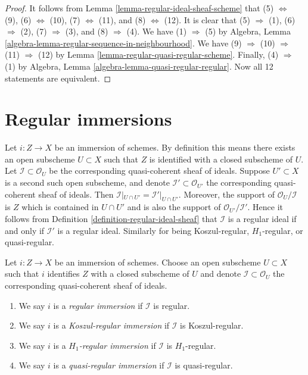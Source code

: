 \begin{proof}
It follows from
Lemma \ref{lemma-regular-ideal-sheaf-scheme}
that (5) $\Leftrightarrow$ (9), (6) $\Leftrightarrow$ (10),
(7) $\Leftrightarrow$ (11), and (8) $\Leftrightarrow$ (12).
It is clear that (5) $\Rightarrow$ (1), (6) $\Rightarrow$ (2),
(7) $\Rightarrow$ (3), and (8) $\Rightarrow$ (4).
We have (1) $\Rightarrow$ (5) by
Algebra, Lemma \ref{algebra-lemma-regular-sequence-in-neighbourhood}.
We have (9) $\Rightarrow$ (10) $\Rightarrow$ (11) $\Rightarrow$ (12) by
Lemma \ref{lemma-regular-quasi-regular-scheme}.
Finally, (4) $\Rightarrow$ (1) by
Algebra, Lemma \ref{algebra-lemma-quasi-regular-regular}.
Now all 12 statements are equivalent.
\end{proof}













\section{Regular immersions}
\label{section-regular-immersions}

\noindent
Let $i : Z \to X$ be an immersion of schemes. By definition this means
there exists an open subscheme $U \subset X$ such that
$Z$ is identified with a closed subscheme of $U$. Let
$\mathcal{I} \subset \mathcal{O}_U$ be the corresponding quasi-coherent
sheaf of ideals. Suppose $U' \subset X$ is a second such open
subscheme, and denote $\mathcal{I}' \subset \mathcal{O}_{U'}$
the corresponding quasi-coherent sheaf of ideals. Then
$\mathcal{I}|_{U \cap U'} = \mathcal{I}'|_{U \cap U'}$.
Moreover, the support of $\mathcal{O}_U/\mathcal{I}$
is $Z$ which is contained in $U \cap U'$ and is also the
support of $\mathcal{O}_{U'}/\mathcal{I}'$. Hence it follows from
Definition \ref{definition-regular-ideal-sheaf}
that $\mathcal{I}$ is a regular ideal if and only if
$\mathcal{I}'$ is a regular ideal. Similarly for being Koszul-regular,
$H_1$-regular, or quasi-regular.

\begin{definition}
\label{definition-regular-immersion}
Let $i : Z \to X$ be an immersion of schemes. Choose an open subscheme
$U \subset X$ such that $i$ identifies $Z$ with a closed
subscheme of $U$ and denote $\mathcal{I} \subset \mathcal{O}_U$
the corresponding quasi-coherent sheaf of ideals.
\begin{enumerate}
\item We say $i$ is a {\it regular immersion} if
$\mathcal{I}$ is regular.
\item We say $i$ is a {\it Koszul-regular immersion} if
$\mathcal{I}$ is Koszul-regular.
\item We say $i$ is a {\it $H_1$-regular immersion} if
$\mathcal{I}$ is $H_1$-regular.
\item We say $i$ is a {\it quasi-regular immersion} if
$\mathcal{I}$ is quasi-regular.
\end{enumerate}
\end{definition}

